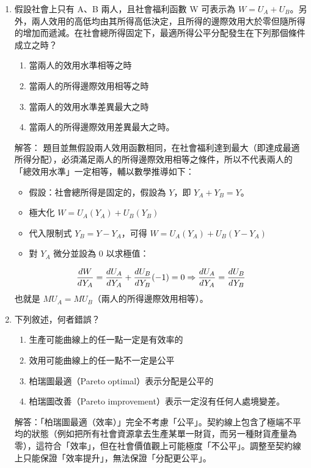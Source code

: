 \documentclass[12pt, a4paper]{article}
\begin{document}
\begin{enumerate}
    \newpage

    \item 假設社會上只有 A、B 兩人，且社會福利函數 W 可表示為 \(W = U_A + U_B\)。另外，兩人效用的高低均由其所得高低決定，且所得的邊際效用大於零但隨所得的增加而遞減。在社會總所得固定下，最適所得公平分配發生在下列那個條件成立之時？
        \begin{enumerate}[label=\Alph*.]
            \item 當兩人的效用水準相等之時
            \item 當兩人的所得邊際效用相等之時
            \item 當兩人的效用水準差異最大之時
            \item 當兩人的所得邊際效用差異最大之時。
        \end{enumerate}
        解答：
        題目並無假設兩人效用函數相同，在社會福利達到最大（即達成最適所得分配），必須滿足兩人的所得邊際效用相等之條件，所以不代表兩人的「總效用水準」一定相等，輔以數學推導如下：
        \begin{itemize}
            \item 假設：社會總所得是固定的，假設為 \(Y\)，即 \(Y_A + Y_B = Y\)。
            \item 極大化 \(W = U_A(Y_A) + U_B(Y_B)\)
            \item 代入限制式 \(Y_B = Y - Y_A\)，可得 \(W = U_A(Y_A) + U_B(Y - Y_A)\)
            \item 對 \(Y_A\) 微分並設為 0 以求極值：
        \end{itemize}
        \[
        \frac{dW}{dY_A} = \frac{dU_A}{dY_A} + \frac{dU_B}{dY_B}(-1) = 0 \\
        \Rightarrow \frac{dU_A}{dY_A} = \frac{dU_B}{dY_B}
        \]
        也就是 $MU_A = MU_B$（兩人的所得邊際效用相等）。

    \item 下列敘述，何者錯誤？
        \begin{enumerate}[label=\Alph*.]
            \item 生產可能曲線上的任一點一定是有效率的
            \item 效用可能曲線上的任一點不一定是公平
            \item 柏瑞圖最適（Pareto optimal）表示分配是公平的
            \item 柏瑞圖改善（Pareto improvement）表示一定沒有任何人處境變差。
        \end{enumerate}
        解答：「柏瑞圖最適（效率）」完全不考慮「公平」。契約線上包含了極端不平均的狀態（例如把所有社會資源拿去生產某單一財貨，而另一種財貨產量為零），這符合「效率」，但在社會價值觀上可能極度「不公平」。調整至契約線上只能保證「效率提升」，無法保證「分配更公平」。


\end{enumerate}
\end{document}
